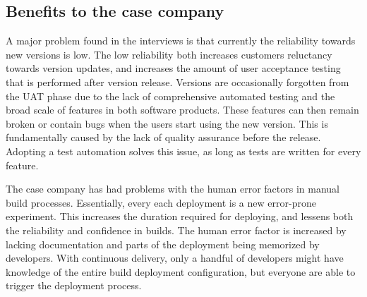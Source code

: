 \documentclass[lnbip]{svmultln}
\begin{document}


\subsection{Benefits to the case company}
A major problem found in the interviews is that currently the reliability towards new versions is low. The low reliability both increases customers reluctancy towards version updates, and increases the amount of user acceptance testing that is performed after version release. Versions are occasionally forgotten from the UAT phase due to the lack of comprehensive automated testing and the broad scale of features in both software products. These features can then remain broken or contain bugs when the users start using the new version. This is fundamentally caused by the lack of quality assurance before the release. Adopting a test automation solves this issue, as long as tests are written for every feature.

The case company has had problems with the human error factors in manual build processes. Essentially, every each deployment is a new error-prone experiment. This increases the duration required for deploying, and lessens both the reliability and confidence in builds. The human error factor is increased by lacking documentation and parts of the deployment being memorized by developers. With continuous delivery, only a handful of developers might have knowledge of the entire build deployment configuration, but everyone are able to trigger the deployment process. 
\end{document}
